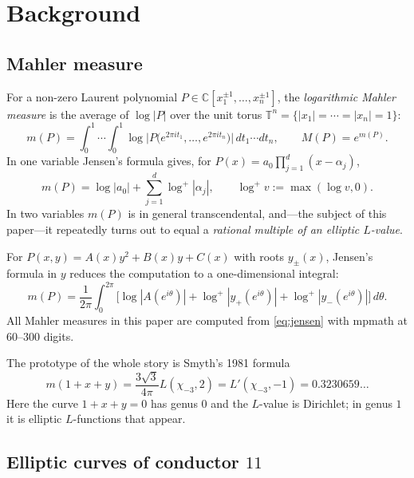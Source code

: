 \documentclass[11pt]{amsart}
\theoremstyle{definition}
\theoremstyle{remark}
\newcommand{\C}{\mathbb{C}}
\newcommand{\T}{\mathbb{T}}
\begin{document}
\section{Background}
\label{sec:background}

\subsection{Mahler measure}

For a non-zero Laurent polynomial
$P\in\C[x_1^{\pm1},\dots,x_n^{\pm1}]$, the \emph{logarithmic Mahler measure}
is the average of $\log|P|$ over the unit torus
$\T^n=\{|x_1|=\cdots=|x_n|=1\}$:
\[
  m(P)=\int_0^1\!\!\cdots\!\int_0^1
  \log\big|P\big(e^{2\pi i t_1},\dots,e^{2\pi i t_n}\big)\big|\,dt_1\cdots dt_n,
  \qquad M(P)=e^{m(P)}.
\]
In one variable Jensen's formula gives, for $P(x)=a_0\prod_{j=1}^d(x-\alpha_j)$,
\[
  m(P)=\log|a_0|+\sum_{j=1}^d\log^+|\alpha_j|,\qquad \log^+v:=\max(\log v,0).
\]
In two variables $m(P)$ is in general transcendental, and---the subject of
this paper---it repeatedly turns out to equal a \emph{rational multiple of an
elliptic $L$-value}.

For $P(x,y)=A(x)y^2+B(x)y+C(x)$ with roots $y_\pm(x)$, Jensen's formula in
$y$ reduces the computation to a one-dimensional integral:
\begin{equation}\label{eq:jensen}
  m(P)=\frac1{2\pi}\int_0^{2\pi}\Big[\log|A(e^{i\theta})|
  +\log^+|y_+(e^{i\theta})|+\log^+|y_-(e^{i\theta})|\Big]\,d\theta.
\end{equation}
All Mahler measures in this paper are computed from \eqref{eq:jensen} with
mpmath \cite{mpmath} at $60$--$300$ digits.

The prototype of the whole story is Smyth's 1981 formula \cite{Smyth}
\[
  m(1+x+y)=\frac{3\sqrt3}{4\pi}L(\chi_{-3},2)=L'(\chi_{-3},-1)=0.3230659\ldots
\]
Here the curve $1+x+y=0$ has genus $0$ and the $L$-value is Dirichlet; in
genus $1$ it is elliptic $L$-functions that appear.

\subsection{Elliptic curves of conductor \texorpdfstring{$11$}{11}}
\end{document}
